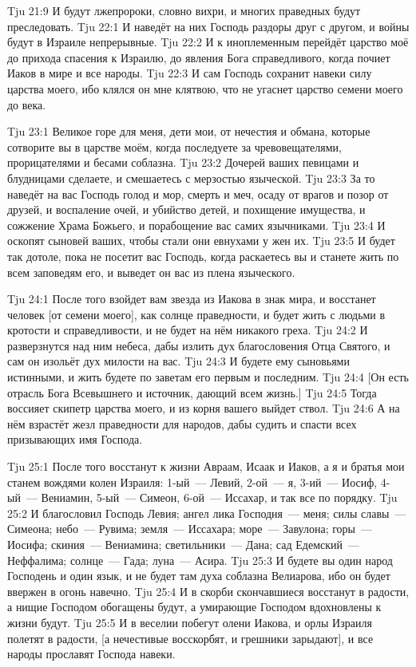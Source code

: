 \vs Tju 21:9
И будут лжепророки, словно вихри, и многих праведных будут преследовать.
\vs Tju 22:1
И наведёт на них Господь раздоры друг с другом,
и войны будут в Израиле непрерывные.
\vs Tju 22:2
И к иноплеменным перейдёт царство моё до прихода спасения к Израилю,
до явления Бога справедливого, когда почиет Иаков в мире и все народы.
\vs Tju 22:3
И сам Господь сохранит навеки силу царства моего,
ибо клялся он мне клятвою, что не угаснет царство семени моего до века.

\vs Tju 23:1
Великое горе для меня, дети мои, от нечестия и обмана,
которые сотворите вы в царстве моём,
когда последуете за чревовещателями, прорицателями и бесами соблазна.
\vs Tju 23:2
Дочерей ваших певицами и блудницами сделаете,
и смешаетесь с мерзостью языческой.
\vs Tju 23:3
За то наведёт на вас Господь голод и мор, смерть и меч,
осаду от врагов и позор от друзей, и воспаление очей,
и убийство детей, и похищение имущества, и сожжение Храма Божьего,
и порабощение вас самих язычниками.
\vs Tju 23:4
И оскопят сыновей ваших, чтобы стали они евнухами у жен их.
\vs Tju 23:5
И будет так дотоле, пока не посетит вас Господь,
когда раскаетесь вы и станете жить по всем заповедям его,
и выведет он вас из плена языческого.

\vs Tju 24:1
После того взойдет вам звезда из Иакова в знак мира,
и восстанет человек [от семени моего],
как солнце праведности, и будет жить с людьми в кротости и справедливости,
и не будет на нём никакого греха.
\vs Tju 24:2
И разверзнутся над ним небеса, дабы излить дух благословения
Отца Святого, и сам он изольёт дух милости на вас.
\vs Tju 24:3
И будете ему сыновьями истинными, и жить будете по заветам
его первым и последним.
\vs Tju 24:4
[Он есть отрасль Бога Всевышнего и источник, дающий всем жизнь.]
\vs Tju 24:5
Тогда воссияет скипетр царства моего, и из корня вашего выйдет ствол.
\vs Tju 24:6
А на нём взрастёт жезл праведности для народов,
дабы судить и спасти всех призывающих имя Господа.

\vs Tju 25:1
После того восстанут к жизни Авраам, Исаак и Иаков,
а я и братья мои станем вождями колен Израиля:
1-ый~--- Левий,
2-ой~--- я,
3-ий~--- Иосиф,
4-ый~--- Вениамин,
5-ый~--- Симеон,
6-ой~--- Иссахар,
и так все по порядку.
\vs Tju 25:2
И благословил Господь Левия;
ангел лика Господня~--- меня;
силы славы~--- Симеона;
небо~--- Рувима;
земля~--- Иссахара;
море~--- Завулона;
горы~--- Иосифа;
скиния~--- Вениамина;
светильники~--- Дана;
сад Едемский~--- Неффалима;
солнце~--- Гада;
луна~--- Асира.
\vs Tju 25:3
И будете вы один народ Господень и один язык,
и не будет там духа соблазна Велиарова,
ибо он будет ввержен в огонь навечно.
\vs Tju 25:4
И в скорби скончавшиеся восстанут в радости, а нищие Господом
обогащены будут, а умирающие Господом вдохновлены к жизни будут.
\vs Tju 25:5
И в веселии побегут олени Иакова,
и орлы Израиля полетят в радости, [а нечестивые
восскорбят, и грешники зарыдают], и все народы прославят Господа навеки.

